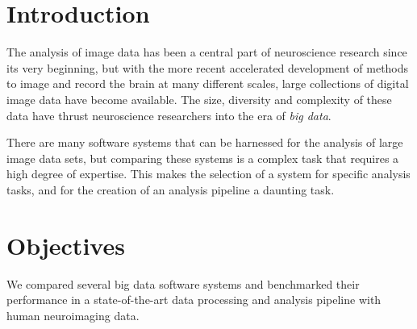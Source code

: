 \documentclass[a0,landscape]{a0poster}
\begin{document}
\vspace{0.5cm} %


\begin{multicols}{3} %

\color{Navy}

\section*{Introduction}

The analysis of image data has been a central part of neuroscience research
since its very beginning, but with the more recent accelerated development of
methods to image and record the brain at many different scales, large
collections of digital image data have become available. The size, diversity and
complexity of these data have thrust neuroscience researchers into the era of
\emph{big data}.

There are many software systems that can be harnessed for the analysis of large
image data sets, but comparing these systems is a complex task that requires a
high degree of expertise. This makes the selection of a system for specific
analysis tasks, and for the creation of an analysis pipeline a daunting task.

\color{DarkSlateGray} %

\section*{Objectives}

We compared several big data software systems and benchmarked their performance
in a state-of-the-art data processing and analysis pipeline with human
neuroimaging data.


\end{multicols}
\end{document}
